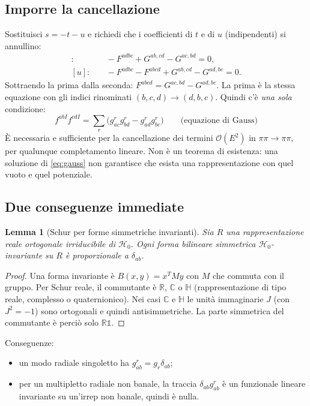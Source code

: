 \documentclass[11pt,a4paper]{article}
\numberwithin{equation}{section}
\newtheorem{lem}{Lemma}
\theoremstyle{remark}
\newcommand{\Hg}{\mathcal{H}_0}
\newcommand{\one}{\mathbb{1}}
\newcommand{\R}{\mathbb{R}}
\newcommand{\C}{\mathbb{C}}
\newcommand{\HH}{\mathbb{H}}
\begin{document}
\subsection{Imporre la cancellazione}
Sostituisci $s=-t-u$ e richiedi che i coefficienti di $t$ e di $u$ (indipendenti) si annullino:
\begin{align*}
[t]:&\quad -F^{adbc}+G^{ab,cd}-G^{ac,bd}=0,\\
[u]:&\quad -F^{adbc}-F^{abcd}+G^{ab,cd}-G^{ad,bc}=0 .
\end{align*}
Sottraendo la prima dalla seconda: $F^{abcd}=G^{ac,bd}-G^{ad,bc}$. La prima è la stessa equazione con gli indici rinominati $(b,c,d)\to(d,b,c)$. Quindi c'è \emph{una sola} condizione:
\begin{equation}
\boxed{\;f^{abI}f^{cdI}=\sum_r\big(g^r_{ac}g^r_{bd}-g^r_{ad}g^r_{bc}\big)\qquad\text{(equazione di Gauss)}\;}
\label{eq:gauss}
\end{equation}
È necessaria e sufficiente per la cancellazione dei termini $\mathcal O(E^2)$ in $\pi\pi\to\pi\pi$, per qualunque completamento lineare. Non è un teorema di esistenza: una soluzione di \eqref{eq:gauss} non garantisce che esista una rappresentazione con quel vuoto e quel potenziale.

\subsection{Due conseguenze immediate}

\begin{lem}[Schur per forme simmetriche invarianti]
Sia $R$ una rappresentazione reale ortogonale irriducibile di $\Hg$. Ogni forma bilineare simmetrica $\Hg$-invariante su $R$ è proporzionale a $\delta_{ab}$.
\end{lem}
\begin{proof}
Una forma invariante è $B(x,y)=x^TMy$ con $M$ che commuta con il gruppo. Per Schur reale, il commutante è $\R$, $\C$ o $\HH$ (rappresentazione di tipo reale, complesso o quaternionico). Nei casi $\C$ e $\HH$ le unità immaginarie $J$ (con $J^2=-1$) sono ortogonali e quindi antisimmetriche. La parte simmetrica del commutante è perciò solo $\R\one$.
\end{proof}
Conseguenze:
\begin{itemize}[nosep]
\item un modo radiale singoletto ha $g^r_{ab}=g_r\delta_{ab}$;
\item per un multipletto radiale non banale, la traccia $\delta_{ab}g^r_{ab}$ è un funzionale lineare invariante su un'irrep non banale, quindi è nulla.
\end{itemize}
\end{document}
